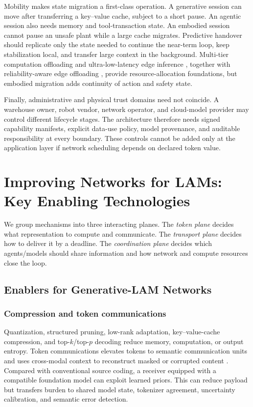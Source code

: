\documentclass[letterpaper,journal]{IEEEtran}
\begin{document}
Mobility makes state migration a first-class operation. A generative session
can move after transferring a key--value cache, subject to a short pause. An
agentic session also needs memory and tool-transaction state. An embodied
session cannot pause an unsafe plant while a large cache migrates. Predictive
handover should replicate only the state needed to continue the near-term
loop, keep stabilization local, and transfer large context in the background.
Multi-tier computation offloading \cite{multitier} and ultra-low-latency edge
inference \cite{edgeinference}, together with reliability-aware edge
offloading \cite{offloading}, provide resource-allocation foundations, but
embodied migration adds continuity of action and safety state.

Finally, administrative and physical trust domains need not coincide. A
warehouse owner, robot vendor, network operator, and cloud-model provider may
control different lifecycle stages. The architecture therefore needs signed
capability manifests, explicit data-use policy, model provenance, and
auditable responsibility at every boundary. These controls cannot be added
only at the application layer if network scheduling depends on declared token
value.

\section{Improving Networks for LAMs: Key Enabling Technologies}
\label{sec:enablers}

We group mechanisms into three interacting planes. The \emph{token plane}
decides what representation to compute and communicate. The
\emph{transport plane} decides how to deliver it by a deadline. The
\emph{coordination plane} decides which agents/models should share
information and how network and compute resources close the loop.

\subsection{Enablers for Generative-LAM Networks}
\subsubsection{Compression and token communications}
Quantization, structured pruning, low-rank adaptation, key--value-cache
compression, and top-$k$/top-$p$ decoding reduce memory, computation, or
output entropy. Token communications elevates tokens to semantic
communication units and uses cross-modal context to reconstruct masked or
corrupted content \cite{tokcom}. Compared with conventional source coding, a
receiver equipped with a compatible foundation model can exploit learned
priors. This can reduce payload but transfers burden to shared model state,
tokenizer agreement, uncertainty calibration, and semantic error detection.
\end{document}
